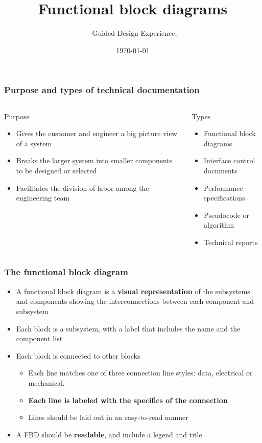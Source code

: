 \documentclass[aspectratio=169]{beamer}
\title{Functional block diagrams}
\subtitle{\usnaCourseNumber\ Guided Design Experience, \usnaCourseTerm}
\author{\usnaInstructorShort}
\date{\today}
\begin{document}
\settitlebg
\begin{frame}
\titlepage
\end{frame}

\setslidebg
\begin{frame}
\frametitle{Purpose and types of technical documentation}
\begin{columns}
\begin{column}{0.5\textwidth}
Purpose
\begin{itemize}
\item Gives the customer and engineer a big picture view of a system
\item Breaks the larger system into smaller components to be designed or selected
\item Facilitates the division of labor among the engineering team
\end{itemize}
\end{column}
\begin{column}{0.5\textwidth}
Types
\begin{itemize}
\item Functional block diagrams
\item Interface control documents
\item Performance specifications
\item Pseudocode or algorithm
\item Technical reports
\end{itemize}
\end{column}
\end{columns}

\begin{frame}
\frametitle{The functional block diagram}
\begin{itemize}
\item A functional block diagram is a \textbf{visual representation} of the subsystems and components showing the interconnections between each component and subsystem
\item Each block is a subsystem, with a label that includes the name and the component list
\item Each block is connected to other blocks 
\begin{itemize}
\item Each line matches one of three connection line styles:  data, electrical or mechanical.
\item \textbf{Each line is labeled with the specifics of the connection}
\item Lines should be laid out in an easy-to-read manner
\end{itemize}
\item A FBD should be \textbf{readable}, and include a legend and title
\end{itemize}
\end{frame}





\end{frame}
\end{document}
